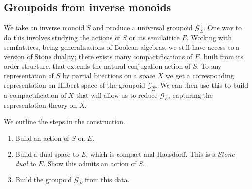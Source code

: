 \documentclass[11pt,]{amsbook}
\theoremstyle{plain}
\theoremstyle{definition}%
\theoremstyle{remark}%
\newcommand{\G}{\mathcal{G}}
\newcommand{\E}{\widehat{E}}
\begin{document}
\subsection{Groupoids from inverse monoids}
We take an inverse monoid $S$ and produce a universal groupoid $\G_{\E}$. One way to do this involves studying the actions of $S$ on its semilattice $E$. Working with semilattices, being generalisations of Boolean algebras, we still have access to a version of Stone duality; there exists many compactifications of $E$, built from its order structure, that extends the natural conjugation action of $S$. To any representation of $S$  by partial bijections on a space $X$ we get a corresponding representation on Hilbert space of the groupoid $\G_{\E}$. We can then use this to build a compactification of $X$ that will allow us to reduce $\G_{\E}$, capturing the representation theory on $X$.

We outline the steps in the construction.
\begin{enumerate}
\item Build an action of $S$ on $E$.
\item Build a dual space to $E$, which is compact and Hausdorff. This is a \textit{Stone dual} to $E$. Show this admits an action of $S$.
\item Build the groupoid $\G_{\E}$ from this data.
\end{enumerate}
\end{document}
